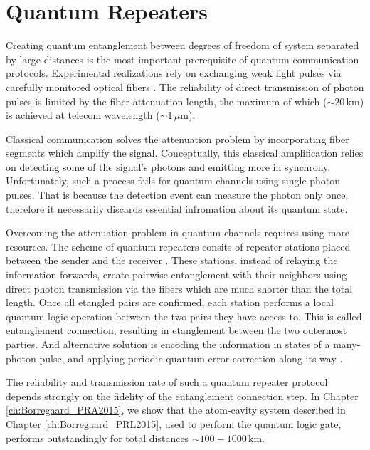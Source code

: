 \section{Quantum Repeaters}
Creating quantum entanglement between degrees of freedom of system separated by
large distances is the most important prerequisite of quantum communication
protocols. Experimental realizations rely on exchanging weak light pulses
via carefully monitored optical fibers \cite{Peev2009}. The
reliability of direct transmission of photon pulses is limited by the
fiber attenuation length, the maximum of which ($\sim 20\,\mathrm{km}$) is
achieved at telecom wavelength ($\sim 1\,\mu\mathrm{m}$).

Classical communication solves the attenuation problem by incorporating fiber
segments which amplify the signal. Conceptually, this classical amplification
relies on detecting some of the signal's photons and emitting more in synchrony.
Unfortunately, such a process fails for quantum channels using single-photon
pulses. That is because the detection event can measure the photon only once,
therefore it necessarily discards essential infromation about its quantum state.

Overcoming the attenuation problem in quantum channels requires using more
resources. The scheme of quantum repeaters consits of repeater stations placed
between the sender and the receiver \cite{bennett2, bennett, duan3}.
These stations, instead of relaying the information forwards, create pairwise
entanglement with their neighbors using direct photon transmission via the
fibers which are much shorter than the total length. Once all etangled pairs are
confirmed, each station performs a local quantum logic operation between the two
pairs they have access to. This is called entanglement connection, resulting in
etanglement between the two outermost parties. And alternative solution is
encoding the information in states of a many-photon pulse, and applying periodic
quantum error-correction along its way \cite{Muralidharan2015}.

The reliability and transmission rate of such a quantum repeater protocol
depends strongly on the fidelity of the entanglement connection step. In Chapter
\ref{ch:Borregaard_PRA2015}, we show that the atom-cavity system described in
Chapter \ref{ch:Borregaard_PRL2015}, used to perform the quantum logic gate,
performs outstandingly for total distances $\sim
100-1000\,\mathrm{km}$.



